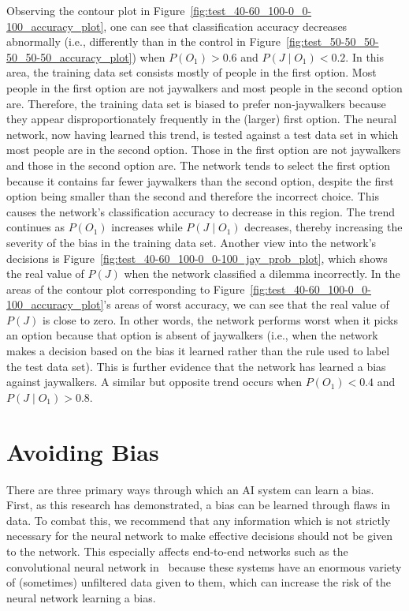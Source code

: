 \documentclass[]{report}
\begin{document}
Observing the contour plot in Figure~\ref{fig:test_40-60_100-0_0-100_accuracy_plot}, one can see
that classification accuracy decreases abnormally (i.e., differently than in the control in
Figure~\ref{fig:test_50-50_50-50_50-50_accuracy_plot}) when $P(O_1) > 0.6$ and $P(J \mid O_1) <
0.2$. In this area, the training data set consists mostly of people in the first option. Most people
in the first option are not jaywalkers and most people in the second option are. Therefore, the
training data set is biased to prefer non-jaywalkers because they appear disproportionately
frequently in the (larger) first option. The neural network, now having learned this trend, is
tested against a test data set in which most people are in the second option. Those in the first
option are not jaywalkers and those in the second option are. The network tends to select the first
option because it contains far fewer jaywalkers than the second option, despite the first option
being smaller than the second and therefore the incorrect choice. This causes the network's
classification accuracy to decrease in this region. The trend continues as $P(O_1)$ increases while
$P(J \mid O_1)$ decreases, thereby increasing the severity of the bias in the training data set.
Another view into the network's decisions is Figure~\ref{fig:test_40-60_100-0_0-100_jay_prob_plot},
which shows the real value of $P(J)$ when the network classified a dilemma incorrectly. In the areas
of the contour plot corresponding to Figure~\ref{fig:test_40-60_100-0_0-100_accuracy_plot}'s areas
of worst accuracy, we can see that the real value of $P(J)$ is close to zero. In other words, the
network performs worst when it picks an option because that option is absent of jaywalkers (i.e.,
when the network makes a decision based on the bias it learned rather than the rule used to label
the test data set). This is further evidence that the network has learned a bias against jaywalkers.
A similar but opposite trend occurs when $P(O_1) < 0.4$ and $P(J \mid O_1) > 0.8$.

\FloatBarrier
\section{Avoiding Bias}

There are three primary ways through which an AI system can learn a bias. First, as this research
has demonstrated, a bias can be learned through flaws in data. To combat this, we recommend that any
information which is not strictly necessary for the neural network to make effective decisions
should not be given to the network. This especially affects end-to-end networks such as the
convolutional neural network in~\cite{bojarski2016end} because these systems have an enormous
variety of (sometimes) unfiltered data given to them, which can increase the risk of the neural
network learning a bias.
\end{document}
